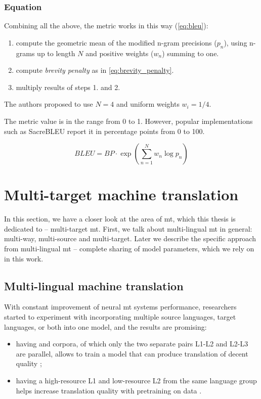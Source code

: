 \subsubsection*{Equation}

Combining all the above, the metric works in this way (\cref{eq:bleu}):
\begin{enumerate}
	\item compute the geometric mean of the modified
		n-gram precisions ($p_n$), using n-grams up to length $N$
		and positive weights ($w_n$) summing to one.
	\item compute \textit{brevity penalty} as in \cref{eq:brevity_penalty}.
	\item multiply results of steps 1. and 2.
\end{enumerate}
The authors proposed to use $N=4$ and uniform weights $w_i = 1/4$.

The metric value is in the range from 0 to 1.
However, popular implementations such as SacreBLEU \citep{Post2018-sacrebleu}
report it in percentage points from 0 to 100.


\begin{equation}
\label{eq:bleu}
	BLEU=BP \cdot \exp \left(\sum_{n=1}^{N} w_n \log p_n \right)
\end{equation}


\section{Multi-target machine translation}
\label{section:multitarget_mt}

In this section, we have a closer look at the area of \acrshort{mt},
which this thesis is dedicated to -- multi-target \acrshort{mt}.
First, we talk about multi-lingual \acrshort{mt} in general: multi-way,
multi-source and multi-target.
Later we describe the specific approach from multi-lingual \acrshort{mt}
-- complete sharing of model parameters, which we rely on in this work.


\subsection{Multi-lingual machine translation}

With constant improvement of neural \acrshort{mt} systems performance,
researchers started to experiment with incorporating multiple source
languages, target languages, or both into one model,
and the results are promising:
\begin{itemize}
	\item having  and  corpora, of which only
	the two separate pairs L1-L2 and L2-L3 are parallel,
	allows to train a model that can produce  translation
	of decent quality \citep{johnson-etal-2017-googles};
	\item having a high-resource L1 and low-resource L2
	from the same language group helps increase  translation
	quality with pretraining on  data 
	\citep{Dabre2017}.
\end{itemize}

